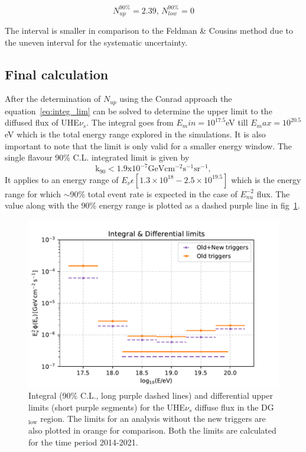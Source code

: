 \begin{equation}
  \label{eq:Conrad_lim}
  N^{90\%}_{up} = 2.39, \,N^{90\%}_{low} = 0
\end{equation}

The interval is smaller in comparison to the Feldman \& Cousins method due to the uneven interval for the systematic uncertainty. 

\subsection{Final calculation}
\label{subsec:final_lim}
After the determination of $N_{up}$ using the Conrad approach the equation~\ref{eq:integ_lim} can be solved to determine the upper limit to the diffused flux of UHE$\nu_s$. The integral goes from $E_min = 10^{17.5} $eV till $E_max = 10^{20.5} $eV which is the total energy range explored in the simulations. It is also important to note that the limit is only valid for a smaller energy window. The single flavour 90\% C.L. integrated limit is given by 
\begin{equation}
  \label{eq:final_lim} 
  \mathrm{k_{90} < 1.9 x 10^{-7} GeV cm^{-2} s^{-1} sr^{-1}},
\end{equation}
It applies to an energy range of $E_{\nu} \epsilon [1.3 \times 10^{18} - 2.5 \times 10^{19.5}]$ which is the energy range for which $\sim$90\% total event rate is expected in the case of $E^{-2}_{nu}$ flux. The value along with the 90\% energy range is plotted as a dashed purple line in fig~\ref{fig:Limit_comp_1}.

\begin{figure}[t!]
  \centering
  \includegraphics[width=14.5cm]{thesis_figures/ExpLimits/Integ_DiffLimit_comp_new_sim_optim.pdf}
  \caption{Integral (90\% C.L., long purple dashed lines) and differential upper limits (short purple segments) for the UHE$\nu_s$ diffuse flux in the DG$\mathrm{_{low}}$ region. The limits for an analysis without the new triggers are also plotted in orange for comparison. Both the limits are calculated for the time period 2014-2021.}
  \label{fig:Limit_comp_1}
\end{figure}

